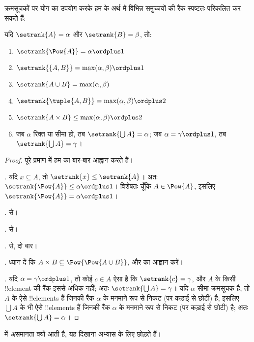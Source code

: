 \documentclass[../../../include/open-logic-section]{subfiles}
\begin{document}

क्रमसूचकों पर योग का उपयोग करके हम
 के अर्थ में विभिन्न समुच्चयों की रैंक
स्पष्टतः परिकलित कर सकते हैं:

\begin{lem}
यदि $\setrank{A} = \alpha$ और $\setrank{B} = \beta$, तो:
\begin{enumerate}
	\item{} $\setrank{\Pow{A}} = \alpha\ordplus 1$
	\item{} $\setrank{\{A, B\}} = \max(\alpha,
	\beta) \ordplus 1$
	\item{} $\setrank{A \cup B} = \max(\alpha,
	\beta)$
	\item{} $\setrank{\tuple{A,B}} = \max(\alpha,
	\beta) \ordplus  2$
	\item{} $\setrank{A \times B} \leq \max(\alpha,
	\beta) \ordplus  2$
	\item{} जब $\alpha$ रिक्त या सीमा हो, तब
	$\setrank{\bigcup A} = \alpha$; जब $\alpha = \gamma\ordplus 1$, तब
	$\setrank{\bigcup A} = \gamma$।
\end{enumerate}
\end{lem}

\begin{proof}
पूरे प्रमाण में हम  का बार-बार आह्वान करते
हैं।

\emph{.} यदि $x \subseteq A$, तो
$\setrank{x} \leq \setrank{A}$। अतः
$\setrank{\Pow{A}} \leq \alpha \ordplus 1$। विशेषतः चूँकि
$A \in \Pow{A}$, इसलिए $\setrank{\Pow{A}} = \alpha \ordplus 1$।

\emph{.}  से।

\emph{.}  से।

\emph{.}  से, दो बार।

\emph{.} ध्यान दें कि
$A \times B \subseteq \Pow{\Pow{A \cup B}}$, और  का
आह्वान करें।

\emph{.} यदि $\alpha = \gamma\ordplus 1$, तो कोई
$c \in A$ ऐसा है कि $\setrank{c} = \gamma$, और $A$ के किसी !!{element}
की रैंक इससे अधिक नहीं; अतः $\setrank{\bigcup A} = \gamma$। यदि $\alpha$
सीमा क्रमसूचक है, तो $A$ के ऐसे !!{element}s हैं जिनकी रैंक $\alpha$ के
मनमाने रूप से निकट (पर कड़ाई से छोटी) है; इसलिए $\bigcup A$ के भी ऐसे
!!{element}s हैं जिनकी रैंक $\alpha$ के मनमाने रूप से निकट (पर कड़ाई से
छोटी) है; अतः $\setrank{\bigcup A} = \alpha$।
\end{proof}
\noindent
{} में \emph{अ}समानता क्यों आती है, यह दिखाना अभ्यास के
लिए छोड़ते हैं।
\end{document}
